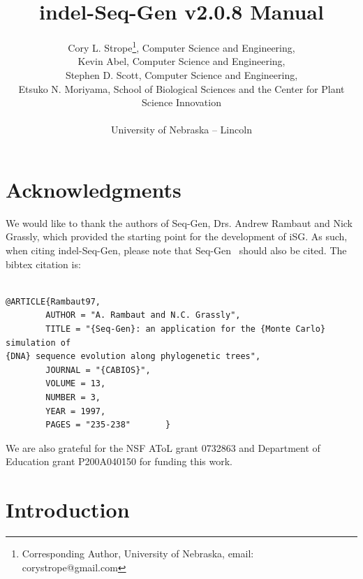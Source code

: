 \documentclass[10pt]{article}
\newcommand{\version}{2.0.8 }
\newcommand{\iSGcurrentlong}{indel-Seq-Gen v\version }
\begin{document}

\title{\iSGcurrentlong Manual}
\author{Cory L. Strope\thanks{Corresponding Author, University of Nebraska, email: 
        corystrope@gmail.com}, Computer Science and Engineering,\\
        Kevin Abel, Computer Science and Engineering,\\
        Stephen D. Scott, Computer Science and Engineering,\\
        Etsuko N. Moriyama, School of Biological Sciences and the Center for Plant Science Innovation\\~\\
		University of Nebraska -- Lincoln
}

\maketitle

\tableofcontents
\newpage
\section{Acknowledgments}

We would like to thank the authors of Seq-Gen, Drs. Andrew Rambaut and Nick Grassly, which provided the starting point for the development of iSG. As such, when citing indel-Seq-Gen, please note that Seq-Gen~\cite{Rambaut97} should also be cited. The bibtex citation is:

\begin{verbatim}

@ARTICLE{Rambaut97,
        AUTHOR = "A. Rambaut and N.C. Grassly",
        TITLE = "{Seq-Gen}: an application for the {Monte Carlo} simulation of 
{DNA} sequence evolution along phylogenetic trees",
        JOURNAL = "{CABIOS}",
        VOLUME = 13,
        NUMBER = 3,
        YEAR = 1997,
        PAGES = "235-238"       }

\end{verbatim}

We are also grateful for the NSF AToL grant 0732863 and Department of Education grant P200A040150 for funding this work.

\newpage

\section{Introduction}
\end{document}
